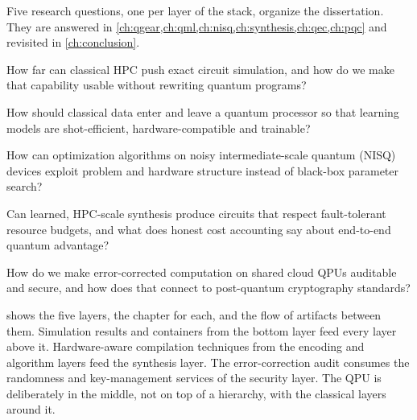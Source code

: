 Five research questions, one per layer of the stack, organize the dissertation. They are answered in \cref{ch:qgear,ch:qml,ch:nisq,ch:synthesis,ch:qec,ch:pqc} and revisited in \cref{ch:conclusion}.

\begin{description}[style=nextline,leftmargin=1.5em]
\item[RQ1 (Scale).] How far can classical HPC push exact circuit simulation, and how do we make that capability usable without rewriting quantum programs?
\item[RQ2 (Data).] How should classical data enter and leave a quantum processor so that learning models are shot-efficient, hardware-compatible and trainable?
\item[RQ3 (Noise).] How can optimization algorithms on noisy intermediate-scale quantum (NISQ) devices exploit problem and hardware structure instead of black-box parameter search?
\item[RQ4 (Synthesis).] Can learned, HPC-scale synthesis produce circuits that respect fault-tolerant resource budgets, and what does honest cost accounting say about end-to-end quantum advantage?
\item[RQ5 (Trust).] How do we make error-corrected computation on shared cloud QPUs auditable and secure, and how does that connect to post-quantum cryptography standards?
\end{description}

 shows the five layers, the chapter for each, and the flow of artifacts between them. Simulation results and containers from the bottom layer feed every layer above it. Hardware-aware compilation techniques from the encoding and algorithm layers feed the synthesis layer. The error-correction audit consumes the randomness and key-management services of the security layer. The QPU is deliberately in the middle, not on top of a hierarchy, with the classical layers around it.

